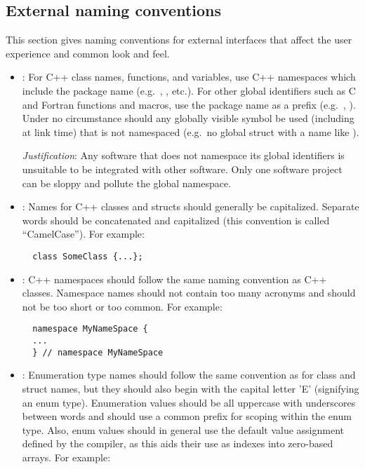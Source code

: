 %
\subsection{External naming conventions}
\label{sec:ExternalNamingConventions}
%

This section gives naming conventions for external interfaces that
affect the user experience and common look and feel.

\begin{itemize}

{}\item\NCNamespaceAllNames: For C++ class names, functions, and
variables, use C++ namespaces which include the package name (e.g.\
{}, {}, etc.).  For other
global identifiers such as C and Fortran functions and macros, use the
package name as a prefix (e.g.\ {}\ttt{MPI\_Comm()},
{}).  Under no circumstance should any globally
visible symbol be used (including at link time) that is not namespaced
(e.g.\ no global struct with a name like {}\ttt{Vec}).

{}\textit{Justification}: Any software that does not namespace its
global identifiers is unsuitable to be integrated with other software.
Only one software project can be sloppy and pollute the global
namespace.

{}\item\NCClassNames: Names for C++ classes and structs should
generally be capitalized.  Separate words should be concatenated and
capitalized (this convention is called ``CamelCase'').  For example:

{\small\begin{verbatim}
  class SomeClass {...};
\end{verbatim}}


{}\item\NCNamespaceNames: C++ namespaces should follow the same naming
convention as C++ classes.  Namespace names should not contain too many
acronyms and should not be too short or too common.  For example:

{\small\begin{verbatim}
  namespace MyNameSpace {
  ...
  } // namespace MyNameSpace 
\end{verbatim}}


{}\item\NCEnumNames: Enumeration type names should follow the same
convention as for class and struct names, but they should also begin
with the capital letter 'E' (signifying an enum type).  Enumeration
values should be all uppercase with underscores between words and
should use a common prefix for scoping within the enum type.  Also,
enum values should in general use the default value assignment defined
by the compiler, as this aids their use as indexes into zero-based
arrays.  For example:


\end{itemize}
